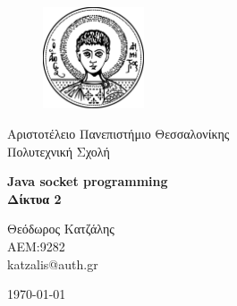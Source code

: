 \begin{titlepage}

\begin{figure}[h!]
  \begin{center}
    \includegraphics[width=3cm]{assets/auth.pdf}
    \label{fig:cover_auth_logo}
  \end{center}
\end{figure}

\centering
\Large Αριστοτέλειο Πανεπιστήμιο Θεσσαλονίκης\\
\Large Πολυτεχνική Σχολή\\

\vspace{\fill}

\LARGE \textbf{Java socket programming} \\
\LARGE \textbf{Δίκτυα 2}

\vspace{\fill}

\Large Θεόδωρος Κατζάλης \\
\Large ΑΕΜ:9282 \\ 
\Large katzalis@auth.gr

\vspace{\fill}
\raggedright

\centering
\vspace{\fill}
\today

\end{titlepage}
